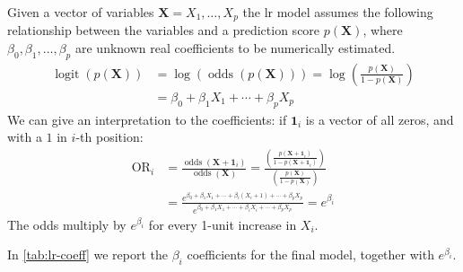 Given a vector of variables $\bm{X} = X_1, \dots, X_p$ the \gls{lr} model assumes the following relationship between the variables and a prediction score $p(\bm{X})$, where $\beta_0, \beta_1, \dots, \beta_p$ are unknown real coefficients to be numerically estimated.
\begin{align*}
    \operatorname{logit}(p(\bm{X})) &= \log (\operatorname{odds}(p(\bm{X}))) = \log \left( \frac{p(\bm{X})}{1-p(\bm{X})} \right)\\
    & = \beta_0 + \beta_1 X_1 + \cdots + \beta_p X_p
\end{align*}
We can give an interpretation to the coefficients: if $\bm{1}_i$ is a vector of all zeros, and with a $1$ in $i$-th position:
\begin{align*}
\operatorname{OR}_i &= \frac{\operatorname{odds}(\bm{X}+\bm{1}_i)}{\operatorname{odds}(\bm{X})} = \frac{\left(\frac{p(\bm{X}+\bm{1}_i)}{1 - p(\bm{X}+\bm{1}_i)}\right)}{\left(\frac{p(\bm{X})}{1 - p(\bm{X})}\right)}\\
&= \frac{e^{\beta_0 + \beta_1 X_1 + \cdots + \beta_i (X_i + 1) + \cdots + \beta_p X_p}}{e^{\beta_0 + \beta_1 X_1 + \cdots + \beta_i X_i + \cdots + \beta_p X_p}} = e^{\beta_i}
\end{align*}
The odds multiply by $e^{\beta_i}$ for every 1-unit increase in $X_i$.
% 

In \autoref{tab:lr-coeff} we report the $\beta_i$ coefficients for the final model, together with $e^{\beta_i}$.

